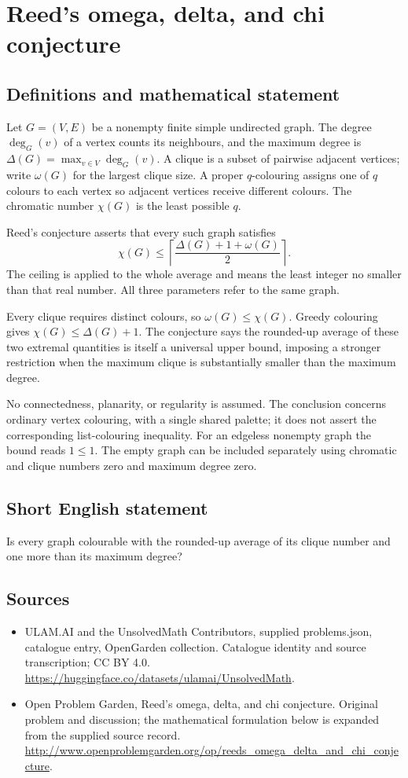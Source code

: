 \documentclass[11pt,a4paper]{article}
\begin{document}
\section*{Reed's omega, delta, and chi conjecture}\label{statement}

\subsection{Definitions and mathematical statement}
Let $G=(V,E)$ be a nonempty
finite simple undirected graph.
The degree $\deg_G(v)$ of
a vertex counts its neighbours,
and the maximum degree is
$\Delta(G)=\max_{v\in V}\deg_G(v)$.
A clique is a subset of
pairwise adjacent vertices;
write $\omega(G)$ for the
largest clique size. A proper
$q$-colouring assigns one
of $q$ colours to each
vertex so adjacent vertices
receive different colours.
The chromatic number $\chi(G)$
is the least possible $q$.

Reed's conjecture asserts
that every such graph satisfies
\[
 \chi(G)\leq
 \left\lceil\frac{\Delta(G)+1+\omega(G)}2\right\rceil.
\]
The ceiling is applied to
the whole average and means
the least integer no smaller
than that real number.
All three parameters refer
to the same graph.

Every clique requires distinct
colours, so $\omega(G)\leq\chi(G)$.
Greedy colouring gives
$\chi(G)\leq\Delta(G)+1$.
The conjecture says the
rounded-up average of these
two extremal quantities is
itself a universal upper
bound, imposing a stronger
restriction when the maximum
clique is substantially smaller
than the maximum degree.

No connectedness, planarity,
or regularity is assumed.
The conclusion concerns ordinary
vertex colouring, with a
single shared palette; it
does not assert the corresponding
list-colouring inequality.
For an edgeless nonempty graph
the bound reads $1\leq1$.
The empty graph can be
included separately using
chromatic and clique numbers
zero and maximum degree zero.
\subsection{Short English statement}
Is every graph colourable with the rounded-up average of its clique number and one more than its maximum degree?
\subsection{Sources}
\begin{itemize}
\item[S1] ULAM.AI and the UnsolvedMath Contributors, supplied problems.json, catalogue entry, OpenGarden collection. Catalogue identity and source transcription; CC BY 4.0.
\url{https://huggingface.co/datasets/ulamai/UnsolvedMath}.
\item[S2] Open Problem Garden, Reed's omega, delta, and chi conjecture. Original problem and discussion; the mathematical formulation below is expanded from the supplied source record.
\url{http://www.openproblemgarden.org/op/reeds_omega_delta_and_chi_conjecture}.
\end{itemize}
\end{document}
